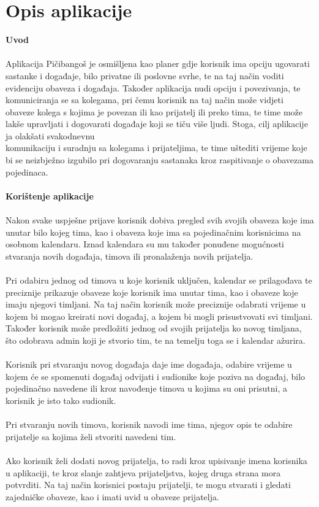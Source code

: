 		\section{Opis aplikacije}

		\bigskip

		\noindent\textbf{Uvod}\\
		\\
		Aplikacija Pičibangoš je osmišljena kao planer gdje korisnik ima opciju ugovarati sastanke i događaje, bilo privatne ili poslovne svrhe, te na taj način voditi evidenciju obaveza i događaja. Također aplikacija nudi opciju i povezivanja, te komuniciranja se sa kolegama, pri čemu korisnik na taj način može vidjeti obaveze kolega s kojima je povezan ili kao prijatelj ili preko tima, te time može lakše upravljati i dogovarati događaje koji se tiču više ljudi. Stoga, cilj aplikacije ja olakšati svakodnevnu \\ komunikaciju i suradnju sa kolegama i prijateljima, te time uštediti vrijeme koje bi se neizbježno izgubilo pri dogovaranju sastanaka kroz raspitivanje o obavezama pojedinaca.  \\
		\\

		\noindent\textbf{Korištenje aplikacije}\\
		\\
		Nakon svake uspješne prijave korisnik dobiva pregled svih svojih obaveza koje ima unutar bilo kojeg tima, kao i obaveza koje ima sa pojedinačnim korisnicima na osobnom kalendaru. Iznad kalendara su mu također ponuđene mogućnosti stvaranja novih događaja, timova ili pronalaženja novih prijatelja.  \\
		\\
		Pri odabiru jednog od timova u koje korisnik uključen, kalendar se prilagođava te preciznije prikazuje obaveze koje korisnik ima unutar tima, kao i obaveze koje imaju njegovi timljani. Na taj način korisnik može preciznije odabrati vrijeme u kojem bi mogao kreirati novi događaj, a kojem bi mogli prisustvovati svi timljani. Također korisnik može predložiti jednog od svojih prijatelja ko novog timljana, što odobrava admin koji je stvorio tim, te na temelju toga se i kalendar ažurira.\\
		\\
		Korisnik pri stvaranju novog događaja daje ime događaja, odabire vrijeme u kojem će se spomenuti događaj odvijati i sudionike koje poziva na događaj, bilo pojedinačno navedene ili kroz navođenje timova u kojima su oni prisutni, a korisnik je isto tako sudionik. \\
		\\
		Pri stvaranju novih timova, korisnik navodi ime tima, njegov opis te odabire prijatelje sa kojima želi stvoriti navedeni tim.\\
		\\
		Ako korisnik želi dodati novog prijatelja, to radi kroz upisivanje imena korisnika u aplikaciji, te kroz slanje zahtjeva prijateljstva, kojeg druga strana mora potvrditi. Na taj način korisnici postaju prijatelji, te mogu stvarati i gledati zajedničke obaveze, kao i imati uvid u obaveze prijatelja.\\
		\pagebreak



		\eject
